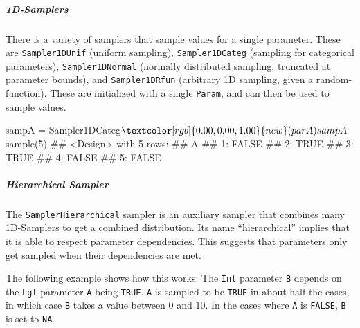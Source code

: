 \documentclass[]{article}
\newenvironment{Shaded}{}{}
\newcommand{\DecValTok}[1]{#1}
\newcommand{\KeywordTok}[1]{\textcolor[rgb]{0.00,0.00,1.00}{#1}}
\newcommand{\NormalTok}[1]{#1}
\newcommand{\OperatorTok}[1]{#1}
\newcommand{\StringTok}[1]{\textcolor[rgb]{0.00,0.50,0.50}{#1}}
\let\oldsubparagraph\subparagraph
\renewcommand{\subparagraph}[1]{\oldsubparagraph{#1}\mbox{}}
\renewenvironment{Shaded} {\begin{snugshade}\small} {\end{snugshade}}
\begin{document}
\hypertarget{d-samplers}{%
\subparagraph{1D-Samplers}\label{d-samplers}}

There is a variety of samplers that sample values for a single parameter.
These are \texttt{Sampler1DUnif} (uniform sampling), \texttt{Sampler1DCateg} (sampling for categorical parameters), \texttt{Sampler1DNormal} (normally distributed sampling, truncated at parameter bounds), and \texttt{Sampler1DRfun} (arbitrary 1D sampling, given a random-function).
These are initialized with a single \texttt{Param}, and can then be used to sample values.

\begin{Shaded}
\begin{Highlighting}[]
\NormalTok{sampA =}\StringTok{ }\NormalTok{Sampler1DCateg}\OperatorTok{$}\KeywordTok{new}\NormalTok{(parA)}
\NormalTok{sampA}\OperatorTok{$}\KeywordTok{sample}\NormalTok{(}\DecValTok{5}\NormalTok{)}
\NormalTok{## <Design> with 5 rows:}
\NormalTok{##        A}
\NormalTok{## 1: FALSE}
\NormalTok{## 2:  TRUE}
\NormalTok{## 3:  TRUE}
\NormalTok{## 4: FALSE}
\NormalTok{## 5: FALSE}
\end{Highlighting}
\end{Shaded}

\hypertarget{hierarchical-sampler}{%
\subparagraph{Hierarchical Sampler}\label{hierarchical-sampler}}

The \texttt{SamplerHierarchical} sampler is an auxiliary sampler that combines many 1D-Samplers to get a combined distribution.
Its name ``hierarchical'' implies that it is able to respect parameter dependencies.
This suggests that parameters only get sampled when their dependencies are met.

The following example shows how this works: The \texttt{Int} parameter \texttt{B} depends on the \texttt{Lgl} parameter \texttt{A} being \texttt{TRUE}.
\texttt{A} is sampled to be \texttt{TRUE} in about half the cases, in which case \texttt{B} takes a value between 0 and 10.
In the cases where \texttt{A} is \texttt{FALSE}, \texttt{B} is set to \texttt{NA}.
\end{document}
